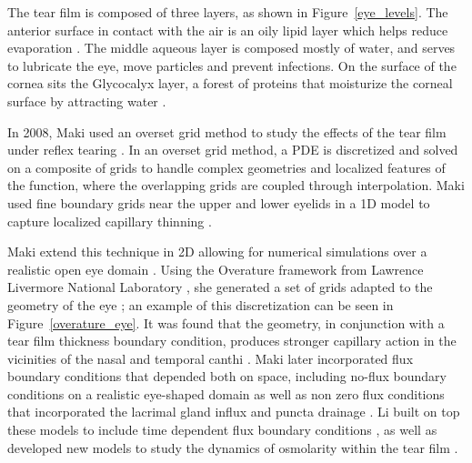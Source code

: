 	The tear film is composed of three layers, as shown in Figure~\ref{eye_levels}. The anterior surface in contact with the air is an oily lipid layer which helps reduce evaporation \cite{norn1979semiquantitative,mishima1961oily}. The middle aqueous layer is composed mostly of water, and serves to lubricate the eye, move particles and prevent infections. On the surface of the cornea sits the Glycocalyx layer, a forest of proteins that moisturize the corneal surface by attracting water \cite{gipson2004distribution}. 
	
 In 2008, Maki used an \textrm{overset grid} method to study the effects of the tear film under reflex tearing \cite{maki2008overset}. In an overset grid method, a PDE is discretized and solved on a composite of grids to handle complex geometries and localized features of the function, where the overlapping grids are coupled through interpolation. Maki used fine boundary grids near the upper and lower eyelids in a 1D model to capture localized capillary thinning \cite{maki2008overset}.
	
	Maki extend this technique in 2D allowing for numerical simulations over a realistic open eye domain \cite{maki2010tear,maki2010tear2}. Using the Overature framework from Lawrence Livermore National Laboratory \cite{chesshire1990composite,henshaw1998ogen}, she generated a set of grids adapted to the geometry of the eye \cite{chesshire1990composite}; an example of this discretization can be seen in Figure~\ref{overature_eye}. It was found that the geometry, in conjunction with a tear film thickness boundary condition, produces stronger capillary action in the vicinities of the nasal and temporal canthi \cite{maki2010tear}. Maki later incorporated flux boundary conditions that depended both on space, including no-flux boundary conditions on a realistic eye-shaped domain as well as non zero flux conditions that incorporated the lacrimal gland influx and puncta drainage \cite{maki2010tear2}. Li built on top these models to include time dependent flux boundary conditions \cite{li2014tear}, as well as developed new models to study the dynamics of osmolarity within the tear film \cite{li2012model,li2015computed}.
	
